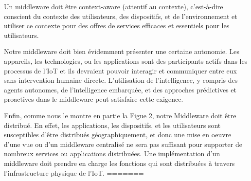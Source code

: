 Un middleware doit être context-aware (attentif au contexte), c'est-à-dire conscient du contexte des utilisateurs, des dispositifs, et de l’environnement et utiliser ce contexte pour des offres de services efficaces et essentiels pour les utilisateurs.

Notre middleware doit bien évidemment présenter une certaine autonomie. Les appareils, les technologies, ou les applications sont des participants actifs dans les processus de l'IoT et ils devraient pouvoir interagir et communiquer entre eux sans intervention humaine directe. L'utilisation de l'intelligence, y compris des agents autonomes, de l’intelligence embarquée, et des approches prédictives et proactives dans le middleware peut satisfaire cette exigence.

Enfin, comme nous le montre en partie la Figue 2, notre Middleware doit être distribué. En effet, les applications, les dispositifs, et les utilisateurs sont susceptibles d'être distribués géographiquement, et donc une mise en oeuvre d’une vue ou d’un middleware centralisé ne sera pas suffisant pour supporter de nombreux services ou applications distribuées. Une implémentation d'un middleware doit prendre en charge les fonctions qui sont distribuées à travers l'infrastructure physique de l'IoT.
=======
